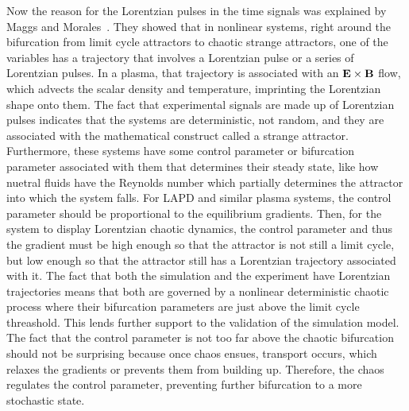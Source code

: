 Now the reason for the Lorentzian pulses in the time signals was explained by Maggs and Morales~\cite{maggs2012a}. They showed that in nonlinear systems, 
right around the bifurcation from limit cycle attractors to chaotic strange attractors, one of the variables has a trajectory that involves a Lorentzian pulse or a series of Lorentzian pulses.
In a plasma, that trajectory is associated with an ${\bf E \times B}$ flow, which advects the scalar density and temperature, imprinting the Lorentzian shape onto them.
The fact that experimental signals are made up of Lorentzian pulses indicates that the systems are deterministic, not random, and they are associated with the mathematical construct called
a strange attractor. Furthermore, these systems have some control parameter or bifurcation parameter associated with them that determines their steady state, 
like how nuetral fluids have the Reynolds number which partially determines the attractor into which the system falls. For LAPD and similar plasma systems, the control parameter should be
proportional to the equilibrium gradients. Then, for the system to display Lorentzian chaotic dynamics, the control parameter and thus the gradient must be high enough so that the attractor is not
still a limit cycle, but low enough so that the attractor still has a Lorentzian trajectory associated with it.
The fact that both the simulation and the experiment have Lorentzian trajectories means that both are governed by a nonlinear deterministic chaotic process where their bifurcation parameters
are just above the limit cycle threashold. This lends further support to the validation of the simulation model. The fact that the control parameter is not too far above the chaotic bifurcation
should not be surprising because once chaos ensues, transport occurs, which relaxes the gradients or prevents them from building up. Therefore, the chaos regulates the control parameter,
preventing further bifurcation to a more stochastic state.

